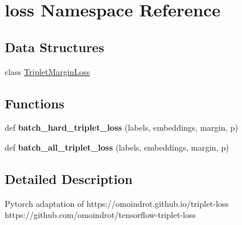 \hypertarget{namespaceloss}{}\section{loss Namespace Reference}
\label{namespaceloss}
\subsection*{Data Structures}
\begin{DoxyCompactItemize}
\item 
class \hyperlink{classloss_1_1TripletMarginLoss}{Triplet\+Margin\+Loss}
\end{DoxyCompactItemize}
\subsection*{Functions}
\begin{DoxyCompactItemize}
\item 
\mbox{\label{namespaceloss_a1389a85818577fd73eded7515d3f8f61}} 
def {\bfseries batch\+\_\+hard\+\_\+triplet\+\_\+loss} (labels, embeddings, margin, p)
\item 
\mbox{\label{namespaceloss_abc9686bec17495a91c1e5d115f3637d4}} 
def {\bfseries batch\+\_\+all\+\_\+triplet\+\_\+loss} (labels, embeddings, margin, p)
\end{DoxyCompactItemize}


\subsection{Detailed Description}
\begin{DoxyVerb}    Pytorch adaptation of https://omoindrot.github.io/triplet-loss
    https://github.com/omoindrot/tensorflow-triplet-loss
\end{DoxyVerb}
 